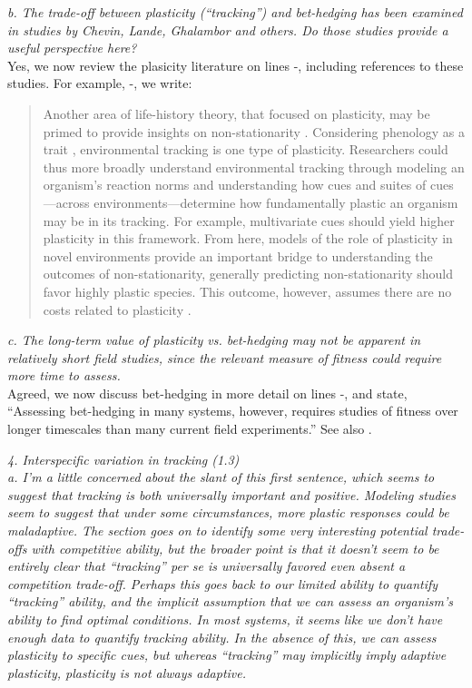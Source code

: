\documentclass[11pt]{article}
\begin{document}
\emph{b.      The trade-off between plasticity (``tracking'') and bet-hedging has been examined in
studies by Chevin, Lande, Ghalambor and others. Do those studies provide a useful perspective
here?}\\

Yes, we now review the plasicity literature on lines -, including references to these studies. For example, -, we write: 
\begin{quote}
Another area of life-history theory, that focused on plasticity, may be primed to provide insights on non-stationarity \citep[or `sustained environmental change,' see][]{chevin2010}. Considering phenology as a trait \citep[as we and others do, e.g.,][]{charm2008,nicotra2010,inouye2019}, environmental tracking is one type of plasticity. Researchers could thus more broadly understand environmental tracking through modeling an organism's reaction norms \citep{pigluicci1998,chmura2019} and understanding how cues and suites of cues---across environments---determine how fundamentally plastic an organism may be in its tracking. For example, multivariate cues should yield higher plasticity in this framework. From here, models of the role of plasticity in novel environments provide an important bridge to understanding the outcomes of non-stationarity, generally predicting non-stationarity should favor highly plastic species. This outcome, however, assumes there are no costs related to plasticity \citep{Ghalambor2007,tufto2015}. 
\end{quote}

\emph{c.      The long-term value of plasticity vs. bet-hedging may not be apparent in relatively
short field studies, since the relevant measure of fitness could require more time to assess.}\\

Agreed, we now discuss bet-hedging in more detail on lines -, and state, ``Assessing bet-hedging in many systems, however, requires studies of fitness over longer timescales than many current field experiments.'' See also .

\emph{4.       Interspecific variation in tracking (1.3) \\
a.      I'm a little concerned about the slant of this first sentence, which seems to suggest
that tracking is both universally important and positive. Modeling studies seem to suggest
that under some circumstances, more plastic responses could be maladaptive.  The section goes
on to identify some very interesting potential trade-offs with competitive ability, but the
broader point is that it doesn't seem to be entirely clear that ``tracking'' per se is
universally favored even absent a competition trade-off. Perhaps this goes back to our
limited ability to quantify ``tracking'' ability, and the implicit assumption that we can
assess an organism's ability to find optimal conditions. In most systems, it seems like we
don't have enough data to quantify tracking ability. In the absence of this, we can assess
plasticity to specific cues, but whereas “tracking” may implicitly imply adaptive plasticity,
plasticity is not always adaptive.}\\
\end{document}
